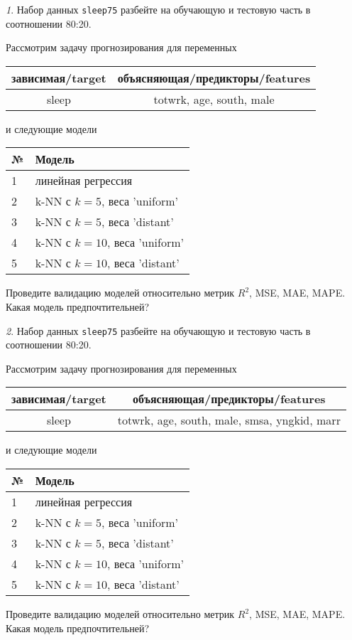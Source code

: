\documentclass[12pt]{article}
\theoremstyle{remark}
\newtheorem{exercise}{}[section]
\begin{document}
\begin{exercise}
Набор данных \texttt{sleep75} разбейте на обучающую и тестовую часть
в соотношении 80:20.

Рассмотрим задачу прогнозирования для переменных
\begin{center}
	\begin{tabular}{|c|c|}\hline
		зависимая/target & объясняющая/предикторы/features \\ \hline
		sleep & totwrk, age, south, male \\ \hline
	\end{tabular}
\end{center}
и следующие модели
\begin{center}
	\begin{tabular}{|l|l|}\hline
		№ & Модель \\ \hline
		1 & линейная регрессия\\
		2 & k-NN с \(k=5\), веса 'uniform' \\
		3 & k-NN с \(k=5\), веса 'distant' \\
		4 & k-NN с \(k=10\), веса 'uniform' \\
		5 & k-NN с \(k=10\), веса 'distant' \\ \hline
	\end{tabular}
\end{center}
Проведите валидацию моделей относительно метрик \(R^2\), MSE, MAE,
MAPE. Какая модель предпочтительней?
\end{exercise}

\begin{exercise}
Набор данных \texttt{sleep75} разбейте на обучающую и тестовую часть
в соотношении 80:20.

Рассмотрим задачу прогнозирования для переменных
\begin{center}
	\begin{tabular}{|c|c|}\hline
		зависимая/target & объясняющая/предикторы/features \\ \hline
		sleep & totwrk, age, south, male, smsa, yngkid, marr \\ \hline
	\end{tabular}
\end{center}
и следующие модели
\begin{center}
	\begin{tabular}{|l|l|}\hline
		№ & Модель \\ \hline
		1 & линейная регрессия\\
		2 & k-NN с \(k=5\), веса 'uniform' \\
		3 & k-NN с \(k=5\), веса 'distant' \\
		4 & k-NN с \(k=10\), веса 'uniform' \\
		5 & k-NN с \(k=10\), веса 'distant' \\ \hline
	\end{tabular}
\end{center}
Проведите валидацию моделей относительно метрик \(R^2\), MSE, MAE,
MAPE. Какая модель предпочтительней?
\end{exercise}
\end{document}
